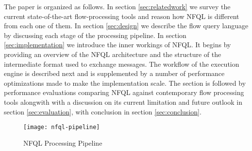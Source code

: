 The paper is organized as follows. In section \ref{sec:relatedwork} we survey
the current state-of-the-art flow-processing tools and reason how \ac{NFQL} is
different from each one of them. In section \ref{sec:design} we describe the
flow query language by discussing each stage of the processing pipeline. In
section \ref{sec:implementation} we introduce the inner workings of \ac{NFQL}.
It begins by providing an overview of the \ac{NFQL} architecture and the
structure of the intermediate format used to exchange messages. The workflow of
the execution engine is described next and is supplemented by a number of
performance optimizations made to make the implementation scale. The section is
followed by performance evaluations comparing \ac{NFQL} against contemporary
flow processing tools alongwith with a discussion on its current limitation and
future outlook in section \ref{sec:evaluation}, with conclusion in section
\ref{sec:conclusion}.

\begin{figure*}[!t]
\centering
\texttt{[image: nfql-pipeline]}
\caption{NFQL Processing Pipeline \cite{vmarinov:2009}}
\label{fig:nfql-pipeline}
\end{figure*}

